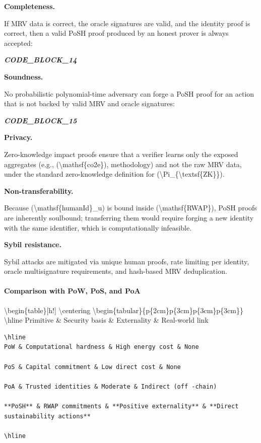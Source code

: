 \documentclass{article}
\begin{document}
\textbf{Completeness.}

If MRV data is correct, the oracle signatures are valid, and the identity proof
is correct, then a valid PoSH proof produced by an honest prover is always
accepted:

\textit{\textbf{CODE\_BLOCK\_14}}

\textbf{Soundness.}

No probabilistic polynomial-time adversary can forge a PoSH proof for an action
that is not backed by valid MRV and oracle signatures:

\textit{\textbf{CODE\_BLOCK\_15}}

\textbf{Privacy.}

Zero-knowledge impact proofs ensure that a verifier learns only the exposed
aggregates (e.g., ({\textbackslash}mathsf\{co2e\}), methodology) and not the raw MRV data,
under the standard zero-knowledge definition for ({\textbackslash}Pi\_\{{\textbackslash}textsf\{ZK\}\}).

\textbf{Non-transferability.}

Because ({\textbackslash}mathsf\{humanId\}\_u) is bound inside ({\textbackslash}mathsf\{RWAP\}), PoSH proofs
are inherently soulbound; transferring them would require forging a new identity
with the same identifier, which is computationally infeasible.

\textbf{Sybil resistance.}

Sybil attacks are mitigated via unique human proofs, rate limiting per identity,
oracle multisignature requirements, and hash-based MRV deduplication.

\paragraph{Comparison with PoW, PoS, and PoA}

{\textbackslash}begin\{table\}[h!]
{\textbackslash}centering
{\textbackslash}begin\{tabular\}\{p\{2cm\}p\{3cm\}p\{3cm\}p\{3cm\}\}
{\textbackslash}hline
Primitive \& Security basis \& Externality \& Real-world link

\begin{verbatim}
\hline
PoW & Computational hardness & High energy cost & None 

PoS & Capital commitment & Low direct cost & None 

PoA & Trusted identities & Moderate & Indirect (off -chain) 

**PoSH** & RWAP commitments & **Positive externality** & **Direct sustainability actions** 

\hline
\end{verbatim}
\end{document}
